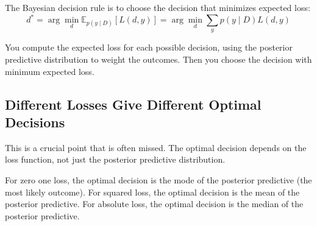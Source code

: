 The Bayesian decision rule is to choose the decision that minimizes expected loss:
\begin{equation}
d^* = \arg\min_{d} \mathbb{E}_{p(y \mid D)}[L(d, y)] = \arg\min_{d} \sum_{y} p(y \mid D) L(d, y)
\end{equation}

You compute the expected loss for each possible decision, using the posterior predictive distribution to weight the outcomes. Then you choose the decision with minimum expected loss.

\subsection{Different Losses Give Different Optimal Decisions}

This is a crucial point that is often missed. The optimal decision depends on the loss function, not just the posterior predictive distribution.

For zero one loss, the optimal decision is the mode of the posterior predictive (the most likely outcome). For squared loss, the optimal decision is the mean of the posterior predictive. For absolute loss, the optimal decision is the median of the posterior predictive.

\vspace{1.5em}

